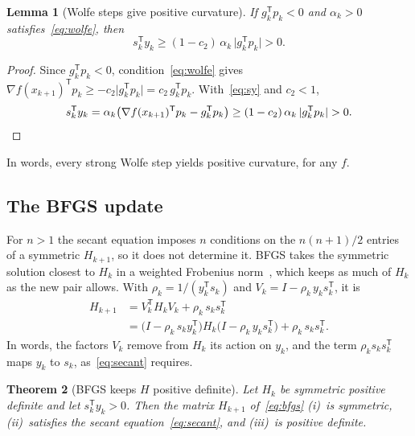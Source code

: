 \documentclass[11pt,a4paper]{amsart}
\numberwithin{equation}{section}
\theoremstyle{plain}
\newtheorem{theorem}{Theorem}[section]
\newtheorem{lemma}[theorem]{Lemma}
\theoremstyle{definition}
\theoremstyle{remark}
\newcommand{\grad}{\nabla}
\newcommand{\T}{\mathsf{T}}
\begin{document}
\begin{lemma}[Wolfe steps give positive curvature]\label{lem:wolfe}
If $g_k^\T p_k < 0$ and $\alpha_k > 0$ satisfies~\eqref{eq:wolfe}, then
\[
  s_k^\T y_k \geq (1 - c_2)\, \alpha_k\, \lvert g_k^\T p_k \rvert > 0 .
\]
\end{lemma}

\begin{proof}
Since $g_k^\T p_k < 0$, condition~\eqref{eq:wolfe} gives
$\grad f(x_{k+1})^\T p_k \geq -c_2 \lvert g_k^\T p_k \rvert
= c_2\, g_k^\T p_k$. With~\eqref{eq:sy} and $c_2 < 1$,
\[
  s_k^\T y_k = \alpha_k \bigl( \grad f(x_{k+1})^\T p_k - g_k^\T p_k \bigr)
  \geq (1 - c_2)\, \alpha_k\, \lvert g_k^\T p_k \rvert > 0 . \qedhere
\]
\end{proof}

In words, every strong Wolfe step yields positive curvature, for any
$f$.

\subsection{The BFGS update}\label{sec:update}

For $n > 1$ the secant equation imposes $n$ conditions on the
$n(n+1)/2$ entries of a symmetric $H_{k+1}$, so it does not determine
it. BFGS takes the symmetric solution closest to $H_k$ in a weighted
Frobenius norm~\cite[\S6.1]{nocedal2006}, which keeps as much of $H_k$
as the new pair allows. With $\rho_k = 1/(y_k^\T s_k)$ and
$V_k = I - \rho_k\, y_k s_k^\T$, it is~\cite[(6.17)]{nocedal2006}
\begin{equation}\label{eq:bfgs}
\begin{split}
  H_{k+1} &= V_k^\T H_k V_k + \rho_k\, s_k s_k^\T \\
  &= \bigl(I - \rho_k\, s_k y_k^\T\bigr) H_k
    \bigl(I - \rho_k\, y_k s_k^\T\bigr) + \rho_k\, s_k s_k^\T .
\end{split}
\end{equation}
In words, the factors $V_k$ remove from $H_k$ its action on $y_k$, and
the term $\rho_k s_k s_k^\T$ maps $y_k$ to $s_k$, as~\eqref{eq:secant}
requires.

\begin{theorem}[BFGS keeps $H$ positive definite]\label{thm:bfgs}
Let $H_k$ be symmetric positive definite and let $s_k^\T y_k > 0$. Then
the matrix $H_{k+1}$ of~\eqref{eq:bfgs} (i)~is symmetric,
(ii)~satisfies the secant equation~\eqref{eq:secant}, and (iii)~is
positive definite.
\end{theorem}
\end{document}
